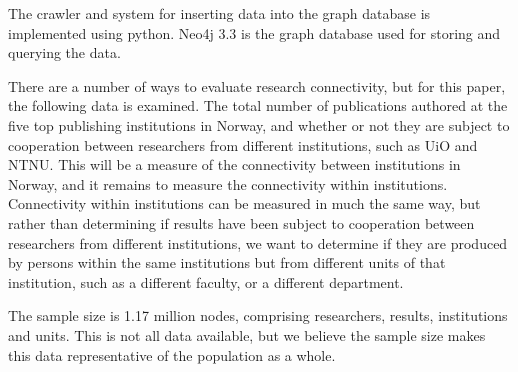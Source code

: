 The crawler and system for inserting data into the graph database is implemented using python.
Neo4j 3.3 is the graph database used for storing and querying the data.


There are a number of ways to evaluate research connectivity, but for this paper, the following data is examined.
The total number of publications authored at the five top publishing institutions in Norway, and whether or not they are subject to cooperation between researchers from different institutions, such as UiO and NTNU.
This will be a measure of the connectivity between institutions in Norway, and it remains to measure the connectivity within institutions.
Connectivity within institutions can be measured in much the same way, but rather than determining if results have been subject to cooperation between researchers from different institutions, we want to determine if they are produced by persons within the same institutions but from different units of that institution, such as a different faculty, or a different department.

The sample size is 1.17 million nodes, comprising researchers, results, institutions and units. This is not all data available, but we believe the sample size makes this data representative of the population as a whole.
